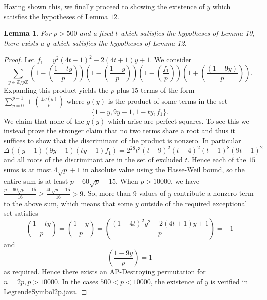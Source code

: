 \documentclass[12pt]{amsart}
\newtheorem{lemma}[thm]{Lemma}
\theoremstyle{definition}
\theoremstyle{remark}
\newcommand{\Z}{\mathbb Z}
\begin{document}
Having shown this, we finally proceed to showing the existence of $y$ which satisfies the hypotheses of Lemma $12$. 
\begin{lemma}\label{Lemma2pPart3} 
For $p>500$ and a fixed $t$ which satisfies the hypotheses of Lemma 10, there exists a $y$ which satisfies the hypotheses of Lemma 12. 
\end{lemma}
\begin{proof}
Let $f_1=y^2(4t-1)^2-2(4t+1)y+1$. We consider
\[\sum_{y\in \Z/p\Z}(1-(\frac{1-ty}{p}))(1-(\frac{1-y}{p}))(1-(\frac{f_1}{p}))(1+(\frac{(1-9y)}{p})).\]
Expanding this product yields the $p$ plus $15$ terms of the form $\sum_{y=0}^{p-1}\pm(\frac{\pm g(y)}{p})$ where $g(y)$ is the product of some terms in the set
\[\{1-y, 9y-1, 1-ty, f_1\}.\]
We claim that none of the $g(y)$ which arise are perfect squares. To see this we instead prove the stronger claim that no two terms share a root and thus it suffices to show that the discriminant of the product is nonzero. In particular \[\Delta((y-1)(9y-1)(ty-1)f_1)=2^{28} t^3 (t-9)^2 (t-4)^2 (t-1)^8 (9 t-1)^2\] and all roots of the discriminant are in the set of excluded $t$. Hence each of the $15$ sums is at most $4\sqrt{p}+1$ in absolute value using the Hasse-Weil bound, so the entire sum is at least $p-60\sqrt{p}-15$. When $p>10000$, we have $\frac{p-60\sqrt{p}-15}{16}\ge \frac{40\sqrt{p}-15}{16}>9$. So, more than $9$ values of $y$ contribute a nonzero term to the above sum, which means that some $y$ outside of the required exceptional set satisfies
\[(\frac{1-ty}{p})=(\frac{1-y}{p})=(\frac{(1-4t)^2y^2-2(4t+1)y+1}{p})=-1\] and \[(\frac{1-9y}{p})=1\]
as required. Hence there exists an AP-Destroying permutation for $n=2p, p>10000$. In the cases $500<p<10000$, the existence of $y$ is verified in LegrendeSymbol2p.java. 
\end{proof}
\end{document}
